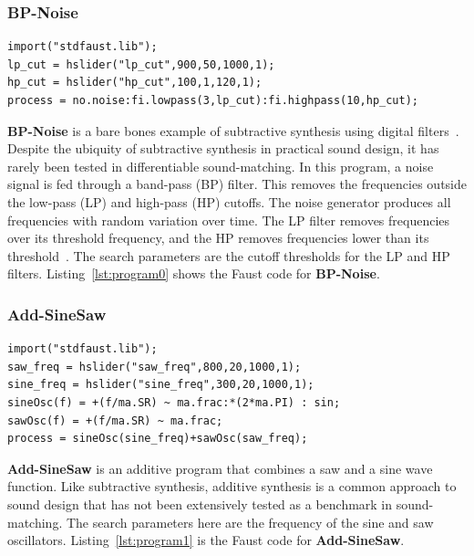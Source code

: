 \documentclass[lettersize,journal]{IEEEtran}
\newcommand{\BPNoise}{\textbf{BP-Noise}}
\newcommand{\AddSineSaw}{\textbf{Add-SineSaw}}
\begin{document}
\subsubsection{\BPNoise}
\label{sec:program0}


\begin{lstlisting}[caption={\BPNoise}, label={lst:program0}, language=Faust,
                  float, floatplacement=htbp, xleftmargin=1em, xrightmargin=0.5em, firstnumber=0]
import("stdfaust.lib");
lp_cut = hslider("lp_cut",900,50,1000,1);
hp_cut = hslider("hp_cut",100,1,120,1);
process = no.noise:fi.lowpass(3,lp_cut):fi.highpass(10,hp_cut);
\end{lstlisting}

\BPNoise{} is a bare bones example of subtractive synthesis using digital filters~\cite{smith2007introduction}. Despite the ubiquity of subtractive synthesis in practical sound design, it has rarely been tested in differentiable sound-matching. In this program, a noise signal is fed through a band-pass (BP) filter. This removes the frequencies outside the low-pass (LP) and high-pass (HP) cutoffs. The noise generator produces all frequencies with random variation over time. The LP filter removes frequencies over its threshold frequency, and the HP removes frequencies lower than its threshold~\cite{smith2007introduction}. The search parameters are the cutoff thresholds for the LP and HP filters. Listing~\ref{lst:program0} shows the Faust code for \BPNoise.
\subsubsection{\AddSineSaw}
\label{sec:program1}

\begin{lstlisting}[caption={\AddSineSaw}, label={lst:program1},language=Faust,float,floatplacement=TBH,xleftmargin=1em,xrightmargin=0.5em,firstnumber=0]
import("stdfaust.lib");
saw_freq = hslider("saw_freq",800,20,1000,1);
sine_freq = hslider("sine_freq",300,20,1000,1);
sineOsc(f) = +(f/ma.SR) ~ ma.frac:*(2*ma.PI) : sin;
sawOsc(f) = +(f/ma.SR) ~ ma.frac;
process = sineOsc(sine_freq)+sawOsc(saw_freq);
\end{lstlisting}

\AddSineSaw{} is an additive program that combines a saw and a sine wave function. Like subtractive synthesis, additive synthesis is a common approach to sound design that has not been extensively tested as a benchmark in sound-matching. The search parameters here are the frequency of the sine and saw oscillators. Listing~\ref{lst:program1} is the Faust code for \AddSineSaw.
\end{document}

